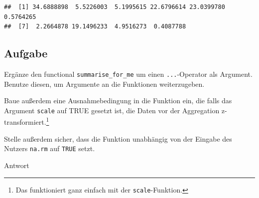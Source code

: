 \documentclass[
]{book}
\newenvironment{Shaded}{\begin{snugshade}}{\end{snugshade}}
\newcommand{\AttributeTok}[1]{\textcolor[rgb]{0.77,0.63,0.00}{#1}}
\newcommand{\ConstantTok}[1]{\textcolor[rgb]{0.00,0.00,0.00}{#1}}
\newcommand{\ControlFlowTok}[1]{\textcolor[rgb]{0.13,0.29,0.53}{\textbf{#1}}}
\newcommand{\DecValTok}[1]{\textcolor[rgb]{0.00,0.00,0.81}{#1}}
\newcommand{\FunctionTok}[1]{\textcolor[rgb]{0.00,0.00,0.00}{#1}}
\newcommand{\NormalTok}[1]{#1}
\newcommand{\OtherTok}[1]{\textcolor[rgb]{0.56,0.35,0.01}{#1}}
\newcommand{\SpecialCharTok}[1]{\textcolor[rgb]{0.00,0.00,0.00}{#1}}
\newcommand{\StringTok}[1]{\textcolor[rgb]{0.31,0.60,0.02}{#1}}
\begin{document}
\begin{verbatim}
##  [1] 34.6888898  5.5226003  5.1995615 22.6796614 23.0399780  0.5764265
##  [7]  2.2664878 19.1496233  4.9516273  0.4087788
\end{verbatim}

\hypertarget{aufgabe-12}{%
\subsection{Aufgabe}\label{aufgabe-12}}

Ergänze den functional \texttt{summarise\_for\_me} um einen \texttt{...}-Operator als Argument.
Benutze diesen, um Argumente an die Funktionen weiterzugeben.

Baue außerdem eine Ausnahmebedingung in die Funktion ein, die falls das Argument \texttt{scale} auf TRUE gesetzt ist, die Daten vor der Aggregation z-transformiert.\footnote{Das funktioniert ganz einfach mit der \texttt{scale}-Funktion.}

Stelle außerdem sicher, dass die Funktion unabhängig von der Eingabe des Nutzers \texttt{na.rm} auf \texttt{TRUE} setzt.

Antwort

\begin{Shaded}
\end{Shaded}
\end{document}
